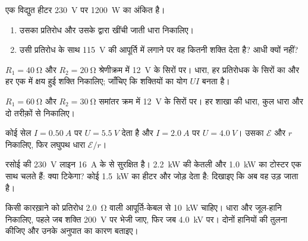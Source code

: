 \begin{exercise}[$\star\star$]\label{exo:g11:circuits-and-power:6}
एक विद्युत हीटर \qty{230}{V} पर \qty{1200}{W} का अंकित है।
\begin{enumerate}
  \item उसका प्रतिरोध और उसके द्वारा खींची जाती धारा निकालिए।
  \item उसी प्रतिरोध के साथ \qty{115}{V} की आपूर्ति में लगाने पर वह
        कितनी शक्ति देता है? आधी क्यों नहीं?
\end{enumerate}
\end{exercise}

\begin{exercise}[$\star\star$]\label{exo:g11:circuits-and-power:7}
$R_1 = \qty{40}{\ohm}$ और $R_2 = \qty{20}{\ohm}$ श्रेणीक्रम में \qty{12}{V} के सिरों पर। धारा, हर प्रतिरोधक के
सिरों का  और हर एक में क्षय हुई शक्ति निकालिए;
जाँचिए कि शक्तियों का योग $UI$ बनता है।
\end{exercise}

\begin{exercise}[$\star\star$]\label{exo:g11:circuits-and-power:8}
$R_1 = \qty{60}{\ohm}$ और $R_2 = \qty{30}{\ohm}$ समांतर क्रम में \qty{12}{V} के सिरों पर। हर शाखा की धारा, कुल
धारा और  दो तरीक़ों से निकालिए।
\end{exercise}

\begin{exercise}[$\star\star$]\label{exo:g11:circuits-and-power:9}
कोई सेल $I = \qty{0.50}{A}$ पर $U = \qty{5.5}{V}$ देता है और $I = \qty{2.0}{A}$ पर $U = \qty{4.0}{V}$। उसका  $\mathcal{E}$ और  $r$ निकालिए, फिर लघुपथ धारा
$\mathcal{E}/r$।
\end{exercise}

\begin{exercise}[$\star\star$]\label{exo:g11:circuits-and-power:10}
रसोई की \qty{230}{V} लाइन \qty{16}{A} के  से सुरक्षित है। \qty{2.2}{kW} की
केतली और \qty{1.0}{kW} का टोस्टर एक साथ चलते हैं: क्या  टिकेगा? कोई
\qty{1.5}{kW} का हीटर और जोड़ देता है: दिखाइए कि अब वह उड़ जाता है।
\end{exercise}

\begin{exercise}[$\star\star$]\label{exo:g11:circuits-and-power:11}
किसी कारख़ाने को प्रतिरोध \qty{2.0}{\ohm} वाली आपूर्ति-केबल से \qty{10}{kW}
चाहिए। धारा और जूल-हानि निकालिए, पहले जब शक्ति \qty{200}{V} पर भेजी जाए,
फिर जब \qty{4.0}{kV} पर। दोनों हानियों की तुलना कीजिए और उनके अनुपात का कारण
बताइए।
\end{exercise}

